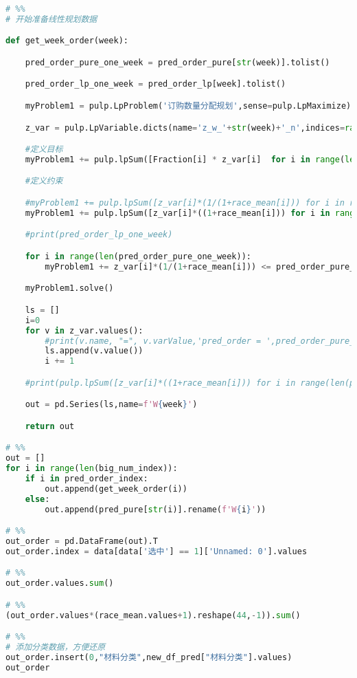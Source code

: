 \begin{appendices}
\begin{lstlisting}[language=python]
# %%
# 开始准备线性规划数据

def get_week_order(week):

    pred_order_pure_one_week = pred_order_pure[str(week)].tolist()

    pred_order_lp_one_week = pred_order_lp[week].tolist()

    myProblem1 = pulp.LpProblem('订购数量分配规划',sense=pulp.LpMaximize)

    z_var = pulp.LpVariable.dicts(name='z_w_'+str(week)+'_n',indices=range(len(pred_order_pure_one_week)),lowBound=0)

    #定义目标
    myProblem1 += pulp.lpSum([Fraction[i] * z_var[i]  for i in range(len(pred_order_pure_one_week))])

    #定义约束

    #myProblem1 += pulp.lpSum([z_var[i]*(1/(1+race_mean[i])) for i in range(len(pred_order_pure_one_week))]) == 2.84e4 + pred_order_lp_one_week
    myProblem1 += pulp.lpSum([z_var[i]*((1+race_mean[i])) for i in range(len(pred_order_pure_one_week))]) ==pred_order_lp_one_week

    #print(pred_order_lp_one_week)

    for i in range(len(pred_order_pure_one_week)):
        myProblem1 += z_var[i]*(1/(1+race_mean[i])) <= pred_order_pure_one_week[i]

    myProblem1.solve()

    ls = []
    i=0
    for v in z_var.values():
        #print(v.name, "=", v.varValue,'pred_order = ',pred_order_pure_one_week[i],'race =',race_mean[i])
        ls.append(v.value())
        i += 1

    #print(pulp.lpSum([z_var[i]*((1+race_mean[i])) for i in range(len(pred_order_pure_one_week))]).value() )

    out = pd.Series(ls,name=f'W{week}')

    return out

# %%
out = []
for i in range(len(big_num_index)):
    if i in pred_order_index:
        out.append(get_week_order(i))
    else:
        out.append(pred_pure[str(i)].rename(f'W{i}'))

# %%
out_order = pd.DataFrame(out).T
out_order.index = data[data['选中'] == 1]['Unnamed: 0'].values

# %%
out_order.values.sum()

# %%
(out_order.values*(race_mean.values+1).reshape(44,-1)).sum()

# %%
# 添加分类数据，方便还原
out_order.insert(0,"材料分类",new_df_pred["材料分类"].values)
out_order


\end{lstlisting}
\end{appendices}
